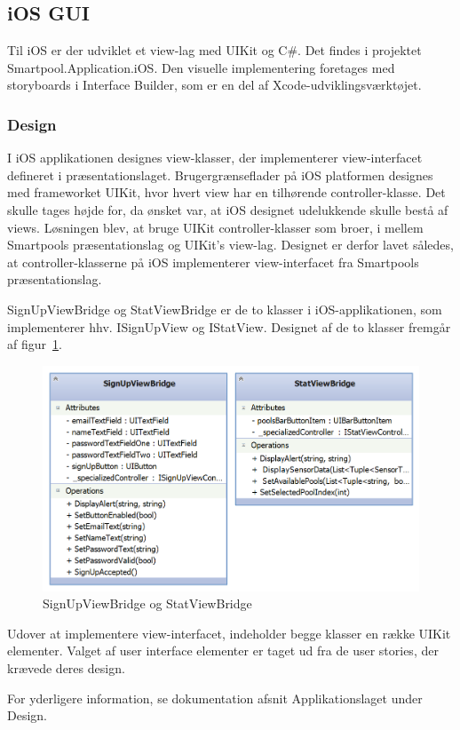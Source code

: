 \subsection{iOS GUI}
Til iOS er der udviklet et view-lag med UIKit og C\#. Det findes i projektet Smartpool.Application.iOS.
Den visuelle implementering foretages med storyboards i Interface Builder, som er en del af Xcode-udviklingsværktøjet.

\subsubsection{Design}
I iOS applikationen designes view-klasser, der implementerer view-interfacet defineret i præsentationslaget. Brugergrænseflader på iOS platformen designes med frameworket UIKit, hvor hvert view har en tilhørende controller-klasse. Det skulle tages højde for, da ønsket var, at iOS designet udelukkende skulle bestå af views. Løsningen blev, at bruge UIKit controller-klasser som broer, i mellem Smartpools præsentationslag og UIKit's view-lag. Designet er derfor lavet således, at controller-klasserne på iOS implementerer view-interfacet fra Smartpools præsentationslag.

SignUpViewBridge og StatViewBridge er de to klasser i iOS-applikationen, som implementerer hhv. ISignUpView og IStatView. Designet af de to klasser fremgår af figur~\ref{fig:ios_viewbridges}.

\begin{figure}
	\centering
	\includegraphics[width=0.7\linewidth]{figs/design/ios_viewbridges}
	\caption{SignUpViewBridge og StatViewBridge}
	\label{fig:ios_viewbridges}
\end{figure}

Udover at implementere view-interfacet, indeholder begge klasser en række UIKit elementer. Valget af user interface elementer er taget ud fra de user stories, der krævede deres design.

For yderligere information, se dokumentation afsnit Applikationslaget under Design.